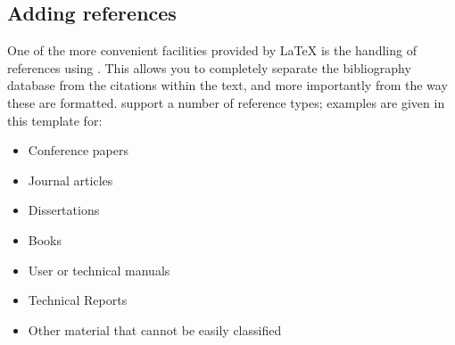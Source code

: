 \subsection{Adding references}
One of the more convenient facilities provided by \LaTeX{} is the handling of
references using \BibTeX.
This allows you to completely separate the bibliography database from the
citations within the text, and more importantly from the way these are
formatted.
\BibTeX support a number of reference types; examples are given in this
template for:
\begin{itemize}
\item Conference papers \cite{bsw10icc}
\item Journal articles \cite{gamal}
\item Dissertations \cite{tunstall}
\item Books \cite{press}
\item User or technical manuals \cite{cuda-pg,netpbm}
\item Technical Reports \cite{bw1994}
\item Other material that cannot be easily classified \cite{farrell}
\end{itemize}
